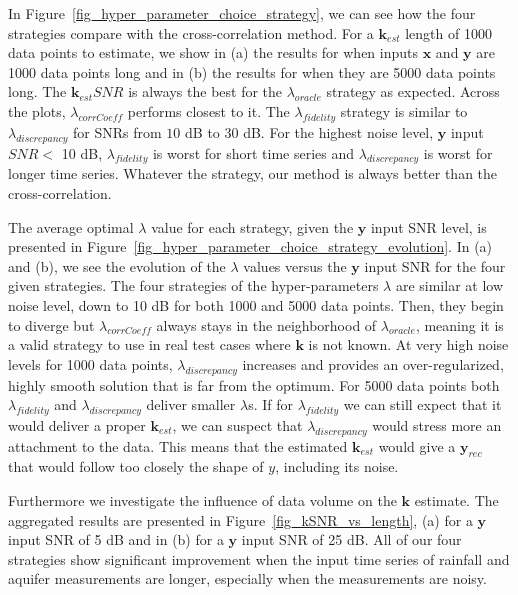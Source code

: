 \documentclass[]{elsarticle} %
\begin{document}
In Figure~\ref{fig_hyper_parameter_choice_strategy}, we can see how the four strategies compare with the cross-correlation method. For a $\textbf{k}_{est}$ length of 1000 data points to estimate, we show in (a) the results for when inputs $\textbf{x}$ and $\textbf{y}$ are 1000 data points long and in (b) the results for when they are 5000 data points long. The $\textbf{k}_{est} SNR$ is always the best for the $\lambda_{oracle}$ strategy as expected. Across the plots, $\lambda_{corrCoeff}$ performs closest to it. The $\lambda_{fidelity}$ strategy is similar to $\lambda_{discrepancy}$ for SNRs from $10$ dB to $30$ dB. For the highest noise level, $\textbf{y}$ input $SNR<$ 10 dB, $\lambda_{fidelity}$ is worst for short time series and $\lambda_{discrepancy}$ is worst for longer time series. Whatever the strategy, our method is always better than the cross-correlation. 

The average optimal $\lambda$ value for each strategy, given the $\textbf{y}$ input SNR level, is presented in Figure~\ref{fig_hyper_parameter_choice_strategy_evolution}. In (a) and (b), we see the evolution of the $\lambda$ values versus the $\textbf{y}$ input SNR for the four given strategies. The four strategies of the hyper-parameters $\lambda$ are similar at low noise level, down to 10 dB for both 1000 and 5000 data points. Then, they begin to diverge but  $\lambda_{corrCoeff}$ always stays in the neighborhood of  $\lambda_{oracle}$, meaning it is a valid strategy to use in real test cases where $\textbf{k}$ is not known. At very high noise levels for 1000 data points,  $\lambda_{discrepancy}$ increases and provides an over-regularized, highly smooth solution that is far from the optimum. For 5000 data points both $\lambda_{fidelity}$ and $\lambda_{discrepancy}$ deliver smaller $\lambda$s. If for $\lambda_{fidelity}$ we can still expect that it would deliver a proper $\textbf{k}_{est}$, we can suspect that $\lambda_{discrepancy}$ would stress more an attachment to the data. This means that the estimated $\textbf{k}_{est}$ would give a $\textbf{y}_{rec}$ that would follow too closely the shape of $y$, including its noise.

Furthermore we investigate the influence of data volume on the $\textbf{k}$ estimate. The aggregated results are presented in Figure~\ref{fig_kSNR_vs_length}, (a) for a $\textbf{y}$ input SNR of 5 dB and in (b) for a $\textbf{y}$ input SNR of 25 dB. All of our four strategies show significant improvement when the input time series of rainfall and aquifer measurements are longer, especially when the measurements are noisy.
\end{document}

